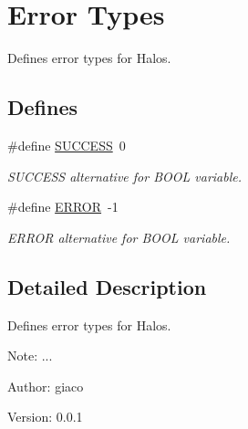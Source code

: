 \hypertarget{group___e_r_r_o_r_t_y_p_e_s}{
\section{Error Types}
\label{group___e_r_r_o_r_t_y_p_e_s}
}
Defines error types for Halos.  


\subsection*{Defines}
\begin{CompactItemize}
\item 
\hypertarget{group___e_r_r_o_r_t_y_p_e_s_ga90cac659d18e8ef6294c7ae337f6b58}{
\#define \hyperlink{group___e_r_r_o_r_t_y_p_e_s_ga90cac659d18e8ef6294c7ae337f6b58}{SUCCESS}~0}
\label{group___e_r_r_o_r_t_y_p_e_s_ga90cac659d18e8ef6294c7ae337f6b58}

\begin{CompactList}\small\item\em SUCCESS alternative for BOOL variable. \item\end{CompactList}\item 
\hypertarget{group___e_r_r_o_r_t_y_p_e_s_g8fe83ac76edc595f6b98cd4a4127aed5}{
\#define \hyperlink{group___e_r_r_o_r_t_y_p_e_s_g8fe83ac76edc595f6b98cd4a4127aed5}{ERROR}~-1}
\label{group___e_r_r_o_r_t_y_p_e_s_g8fe83ac76edc595f6b98cd4a4127aed5}

\begin{CompactList}\small\item\em ERROR alternative for BOOL variable. \item\end{CompactList}\end{CompactItemize}


\subsection{Detailed Description}
Defines error types for Halos. 

\begin{Desc}
\item[Note:]... \end{Desc}
\begin{Desc}
\item[Author:]giaco \end{Desc}
\begin{Desc}
\item[Version:]0.0.1 \end{Desc}
